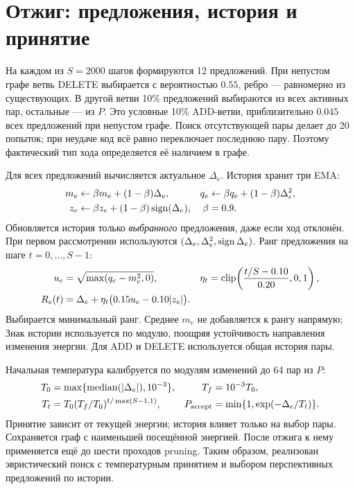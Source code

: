 \documentclass[11pt,a4paper]{article}
\begin{document}
\section{Отжиг: предложения, история и принятие}
На каждом из $S=2000$ шагов формируются 12 предложений. При непустом графе
ветвь DELETE выбирается с вероятностью $0.55$, ребро --- равномерно из существующих.
В другой ветви 10\% предложений выбираются из всех активных пар, остальные --- из $P$.
Это условные 10\% ADD-ветви, приблизительно $0.045$ всех предложений при непустом графе.
Поиск отсутствующей пары делает до 20 попыток; при неудаче код всё равно переключает
последнюю пару. Поэтому фактический тип хода определяется её наличием в графе.

Для всех предложений вычисляется актуальное $\Delta_e$. История хранит три EMA:
\begin{align}
 m_e&\leftarrow\beta m_e+(1-\beta)\Delta_e,&
 q_e&\leftarrow\beta q_e+(1-\beta)\Delta_e^2,\\
 z_e&\leftarrow\beta z_e+(1-\beta)\operatorname{sign}(\Delta_e),&\beta&=0.9.
\end{align}
Обновляется история только \emph{выбранного} предложения, даже если ход отклонён.
При первом рассмотрении используются $(\Delta_e,\Delta_e^2,\operatorname{sign}\Delta_e)$.
Ранг предложения на шаге $t=0,\ldots,S-1$:
\begin{align}
 u_e&=\sqrt{\max(q_e-m_e^2,0)}, &
 \eta_t&=\operatorname{clip}\!\left(\frac{t/S-0.10}{0.20},0,1\right),\\
 R_e(t)&=\Delta_e+\eta_t\bigl(0.15u_e-0.10|z_e|\bigr).
\end{align}
Выбирается минимальный ранг. Среднее $m_e$ не добавляется к рангу напрямую;
Знак истории используется по модулю, поощряя устойчивость направления изменения энергии.
Для ADD и DELETE используется общая история пары.

Начальная температура калибруется по модулям изменений до 64 пар из $P$:
\begin{align}
 T_0&=\max\{\operatorname{median}(|\Delta_e|),10^{-3}\}, & T_f&=10^{-3}T_0,\\
 T_t&=T_0(T_f/T_0)^{t/\max(S-1,1)}, &
 P_{\rm accept}&=\min\{1,\exp(-\Delta_e/T_t)\}.
\end{align}
Принятие зависит от текущей энергии; история влияет только на выбор пары.
Сохраняется граф с наименьшей посещённой энергией. После отжига к нему применяется
ещё до шести проходов pruning. Таким образом, реализован эвристический поиск
с температурным принятием и выбором перспективных предложений по истории.
\end{document}
